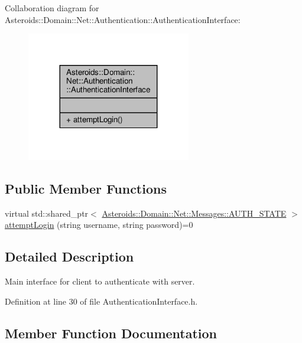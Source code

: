 Collaboration diagram for Asteroids\+:\+:Domain\+:\+:Net\+:\+:Authentication\+:\+:Authentication\+Interface\+:\nopagebreak
\begin{figure}[H]
\begin{center}
\leavevmode
\includegraphics[width=203pt]{classAsteroids_1_1Domain_1_1Net_1_1Authentication_1_1AuthenticationInterface__coll__graph}
\end{center}
\end{figure}
\subsection*{Public Member Functions}
\begin{DoxyCompactItemize}
\item 
virtual std\+::shared\+\_\+ptr$<$ \hyperlink{classAsteroids_1_1Domain_1_1Net_1_1Messages_1_1AUTH__STATE}{Asteroids\+::\+Domain\+::\+Net\+::\+Messages\+::\+A\+U\+T\+H\+\_\+\+S\+T\+A\+TE} $>$ \hyperlink{classAsteroids_1_1Domain_1_1Net_1_1Authentication_1_1AuthenticationInterface_a2358abf451a5aa6df9d29e9dfda2898c}{attempt\+Login} (string username, string password)=0
\end{DoxyCompactItemize}


\subsection{Detailed Description}
Main interface for client to authenticate with server. 

Definition at line 30 of file Authentication\+Interface.\+h.



\subsection{Member Function Documentation}
\mbox{\label{classAsteroids_1_1Domain_1_1Net_1_1Authentication_1_1AuthenticationInterface_a2358abf451a5aa6df9d29e9dfda2898c}} 

